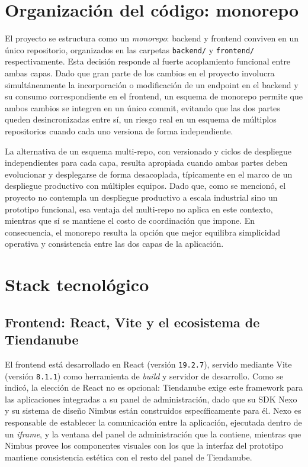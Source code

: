 \section{Organización del código: monorepo}

El proyecto se estructura como un \emph{monorepo}: backend y frontend conviven en un único repositorio, organizados en las carpetas \texttt{backend/} y \texttt{frontend/} respectivamente. Esta decisión responde al fuerte acoplamiento funcional entre ambas capas. Dado que gran parte de los cambios en el proyecto involucra simultáneamente la incorporación o modificación de un endpoint en el backend y su consumo correspondiente en el frontend, un esquema de monorepo permite que ambos cambios se integren en un único commit, evitando que las dos partes queden desincronizadas entre sí, un riesgo real en un esquema de múltiplos repositorios cuando cada uno versiona de forma independiente.

La alternativa de un esquema multi-repo, con versionado y ciclos de despliegue independientes para cada capa, resulta apropiada cuando ambas partes deben evolucionar y desplegarse de forma desacoplada, típicamente en el marco de un despliegue productivo con múltiples equipos. Dado que, como se mencionó, el proyecto no contempla un despliegue productivo a escala industrial sino un prototipo funcional, esa ventaja del multi-repo no aplica en este contexto, mientras que sí se mantiene el costo de coordinación que impone. En consecuencia, el monorepo resulta la opción que mejor equilibra simplicidad operativa y consistencia entre las dos capas de la aplicación.

\section{Stack tecnológico}

\subsection{Frontend: React, Vite y el ecosistema de Tiendanube}

El frontend está desarrollado en React (versión \texttt{19.2.7}), servido mediante Vite (versión \texttt{8.1.1}) como herramienta de \emph{build} y servidor de desarrollo. Como se indicó, la elección de React no es opcional: Tiendanube exige este framework para las aplicaciones integradas a su panel de administración, dado que su SDK Nexo y su sistema de diseño Nimbus están construidos específicamente para él. Nexo es responsable de establecer la comunicación entre la aplicación, ejecutada dentro de un \emph{iframe}, y la ventana del panel de administración que la contiene, mientras que Nimbus provee los componentes visuales con los que la interfaz del prototipo mantiene consistencia estética con el resto del panel de Tiendanube.

